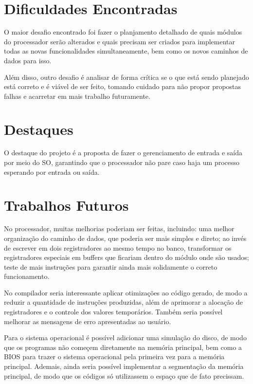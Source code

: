 \documentclass[
	12pt,				%
	oneside,
	a4paper,			%
	english,			%
	french,				%
	spanish,			%
	brazil,				%
	]{abntex2}
\begin{document}
\section{Dificuldades Encontradas}
O maior desafio encontrado foi fazer o planjamento detalhado de quais módulos do processador serão alterados e quais precisam ser criados para implementar todas as novas funcionalidades simultaneamente, bem como os novos caminhos de dados para isso.

Além disso, outro desafio é analisar de forma crítica se o que está sendo planejado está correto e é viável de ser feito, tomando cuidado para não propor propostas falhas e acarretar em mais trabalho futuramente.

\section{Destaques}
O destaque do projeto é a proposta de fazer o gerenciamento de entrada e saída por meio do SO, garantindo que o processador não pare caso haja um processo esperando por entrada ou saída.

\section{Trabalhos Futuros}
No processador, muitas melhorias poderiam ser feitas, incluindo: uma melhor organização do caminho de dados, que poderia ser mais simples e direto; ao invés de escrever em dois registradores ao mesmo tempo no banco, transformar os registradores especiais em buffers que ficariam dentro do módulo onde são usados; teste de mais instruções para garantir ainda mais solidamente o correto funcionamento.

No compilador seria interessante aplicar otimizações ao código gerado, de modo a reduzir a quantidade de instruções produzidas, além de aprimorar a alocação de registradores e o controle dos valores temporários. Também seria possível melhorar as mensagens de erro apresentadas ao usuário.

Para o sistema operacional é possível adicionar uma simulação do disco, de modo que os programas não começem diretamente na memória principal, bem como a BIOS para trazer o sistema operacional pela primeira vez para a memória principal. Ademais, ainda seria possível implementar a segmentação da memória principal, de modo que os códigos só utilizassem o espaço que de fato precissam.


\postextual


\end{document}

